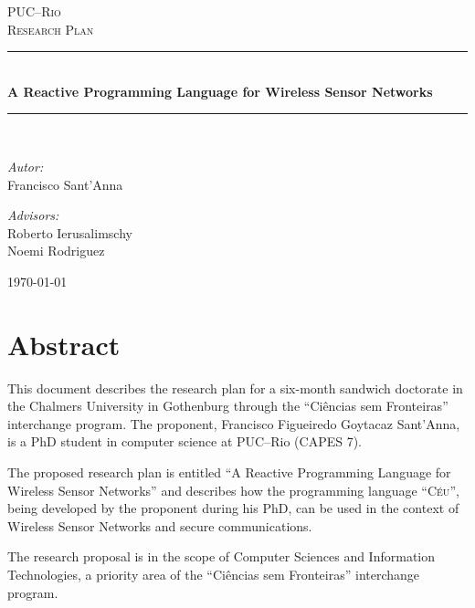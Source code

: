 \documentclass[pdftex,12pt,a4paper]{article}
\newcommand{\CEU}{\textsc{C\'{e}u}}
\begin{document}
\begin{titlepage}
\begin{center}

\textsc{\LARGE PUC--Rio}\\[1.5cm]
\textsc{\Large Research Plan}\\[0.8cm]

\newcommand{\HRule}{\rule{\linewidth}{0.5mm}}
\HRule \\[0.4cm]
{ \huge \bfseries A Reactive Programming Language for Wireless Sensor 
Networks}\\[0.4cm]
\HRule \\[1.5cm]

\begin{minipage}{0.4\textwidth}
\begin{flushleft} \large
\emph{Autor:}\\
Francisco Sant'Anna
\end{flushleft}
\end{minipage}
\begin{minipage}{0.4\textwidth}
\begin{flushright} \large
\emph{Advisors:} \\
Roberto Ierusalimschy \\
Noemi Rodriguez
\end{flushright}
\end{minipage}

\vfill
{\large \today}
\end{center}
\end{titlepage}

\tableofcontents

\newpage
\section{Abstract}
This document describes the research plan for a six-month sandwich doctorate in 
the Chalmers University in Gothenburg through the ``Ci\^encias sem Fronteiras'' 
interchange program.
The proponent, Francisco Figueiredo Goytacaz Sant'Anna, is a PhD student in 
computer science at PUC--Rio (CAPES 7).

The proposed research plan is entitled ``A Reactive Programming Language for 
Wireless Sensor Networks'' and describes how the programming language 
``\CEU{}'', being developed by the proponent during his PhD, can be used in the 
context of Wireless Sensor Networks and secure communications.

The research proposal is in the scope of Computer Sciences and Information 
Technologies, a priority area of the ``Ci\^encias sem Fronteiras'' interchange 
program.
\end{document}
